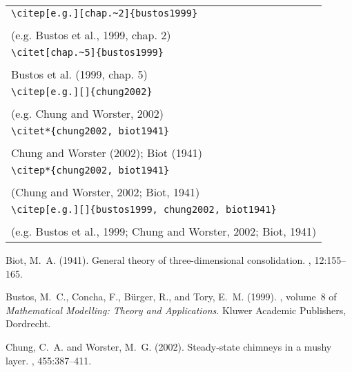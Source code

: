 \documentclass{article}
\begin{document}
\begin{center}
\begin{tabular}{l}
\verb#\citep[e.g.][chap.~2]{bustos1999}#\\
\citep[e.g.][chap.~2]{bustos1999} \\
(e.g. Bustos et al., 1999, chap. 2)\\
\hline
\verb#\citet[chap.~5]{bustos1999}#\\
\citet[chap.~5]{bustos1999}\\
Bustos et al. (1999, chap. 5)\\
 \hline 
\verb#\citep[e.g.][]{chung2002}#\\
\citep[e.g.][]{chung2002} \\
(e.g. Chung and Worster, 2002)\\
 \hline
\verb#\citet*{chung2002, biot1941}#\\
\citet*{chung2002, biot1941}\\
Chung and Worster (2002); Biot (1941)\\
\hline
\verb#\citep*{chung2002, biot1941}#\\
\citep*{chung2002, biot1941}\\
(Chung and Worster, 2002; Biot, 1941)\\
\hline
\verb#\citep[e.g.][]{bustos1999, chung2002, biot1941}#\\
\citep[e.g.][]{bustos1999, chung2002, biot1941} \\
(e.g. Bustos et al., 1999; Chung and Worster, 2002; Biot, 1941)\\

\end{tabular}
\end{center}

%

\begin{thebibliography}{}

Biot, M.~A. (1941).
\newblock General theory of three-dimensional consolidation.
, 12:155--165.

Bustos, M.~C., Concha, F., B\"{u}rger, R., and Tory, E.~M. (1999).
, volume~8 of {\em Mathematical Modelling: Theory and
  Applications}.
\newblock Kluwer Academic Publishers, Dordrecht.

Chung, C.~A. and Worster, M.~G. (2002).
\newblock Steady-state chimneys in a mushy layer.
, 455:387--411.

\end{thebibliography}
\end{document}
